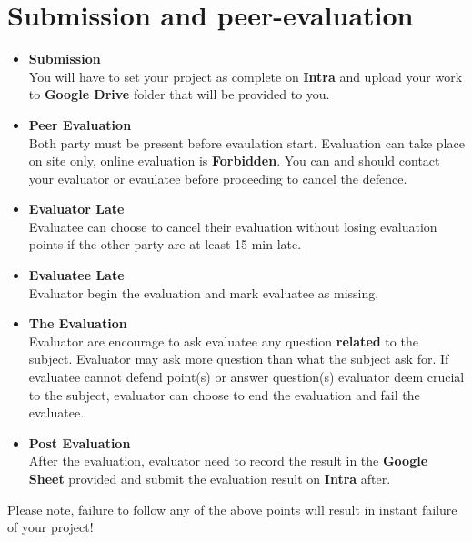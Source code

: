 \documentclass[12pt, a4paper]{report}
\begin{document}
\chapter{Submission and peer-evaluation}
	\begin{itemize}
		\item \textbf{Submission} \\
			You will have to set your project as complete on \textbf{Intra} and
			upload your work to \textbf{Google Drive}
			folder that will be provided to you.
		\item \textbf{Peer Evaluation} \\
			Both party must be present before evaulation start.
			Evaluation can take place on site only, online evaluation is \textbf{Forbidden}.
			You can and should contact your evaluator or evaulatee before proceeding to cancel the defence.
		\item \textbf{Evaluator Late} \\
			Evaluatee can choose to cancel their evaluation without
			losing evaluation points if the other party are at least 15 min late.
		\item \textbf{Evaluatee Late} \\
			Evaluator begin the evaluation and mark evaluatee as missing.
		\item \textbf{The Evaluation} \\
			Evaluator are encourage to ask evaluatee any question \textbf{related} to the subject.
			Evaluator may ask more question than what the subject ask for.
			If evaluatee cannot defend point(s) or answer question(s) evaluator deem crucial to the subject,
			evaluator can choose to end the evaluation and fail the evaluatee.
		\item \textbf{Post Evaluation} \\
			After the evaluation, evaluator need to record the result in the \textbf{Google Sheet} provided and
			submit the evaluation result on \textbf{Intra} after.
		\end{itemize}

	\begin{caja}
		\vspace{.8cm}
		\footnotesize Please note, failure to follow any of the above points will result in instant failure of your project!
		\end{caja}
\end{document}
